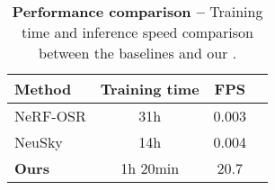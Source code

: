 
\begin{table}[t]
  \centering
  \begin{tabular}{lccc}
    \toprule
    \textbf{Method}                   & \textbf{Training time} & \textbf{FPS} \\
    \midrule
    NeRF-OSR \cite{rudnev2022nerfosr} & 31h                    & 0.003        \\
    NeuSky \cite{gardner2023neusky}   & 14h                    & 0.004        \\
    \textbf{Ours}                     & 1h 20min               & 20.7         \\
    \bottomrule
  \end{tabular}
  \caption{\textbf{Performance comparison --}
    Training time and inference speed comparison between the baselines and our
    \lumigauss.
  }
  \label{tab:lumigauss-performance}
\end{table}
